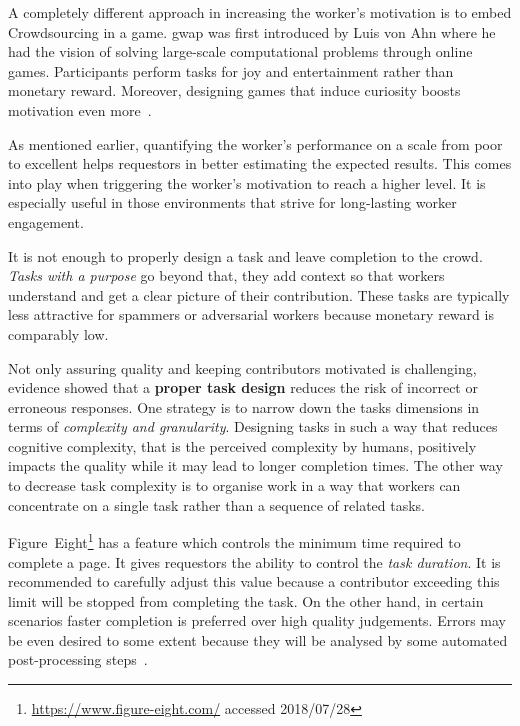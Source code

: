 A completely different approach in increasing the worker's motivation is to embed Crowdsourcing in a game. \gls{gwap} was first introduced by Luis von Ahn\cite{ahn2006} where he had the vision of solving large-scale computational problems through online games. Participants perform tasks for joy and entertainment rather than monetary reward. Moreover, designing games that induce curiosity boosts motivation even more~\cite{law2016}. 

As mentioned earlier, quantifying the worker's performance on a scale from poor to excellent helps requestors in better estimating the expected results. This comes into play when triggering the worker's motivation to reach a higher level. It is especially useful in those environments that strive for long-lasting worker engagement. 

It is not enough to properly design a task and leave completion to the crowd. \emph{Tasks with a purpose} go beyond that, they add context so that workers understand and get a clear picture of their contribution. These tasks are typically less attractive for spammers or adversarial workers because monetary reward is comparably low. 

Not only assuring quality and keeping contributors motivated is challenging, evidence showed that a \textbf{proper task design} reduces the risk of incorrect or erroneous responses. One strategy is to narrow down the tasks dimensions in terms of \emph{complexity and granularity}. Designing tasks in such a way that reduces cognitive complexity, that is the perceived complexity by humans, positively impacts the quality while it may lead to longer completion times. The other way to decrease task complexity is to organise work in a way that workers can concentrate on a single task rather than a sequence of related tasks.  

Figure~Eight\footnote{\url{https://www.figure-eight.com/} accessed 2018/07/28} has a feature which controls the minimum time required to complete a page. It gives requestors the ability to control the \emph{task duration}. It is recommended to carefully adjust this value because a contributor exceeding this limit will be stopped from completing the task. On the other hand, in certain scenarios faster completion is preferred over high quality judgements. Errors may be even desired to some extent because they will be analysed by some automated post-processing steps~\cite{krishna2016}. 

